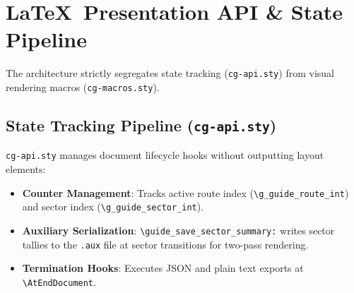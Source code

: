 \clearpage
\section{\LaTeX\ Presentation API \& State Pipeline}

The architecture strictly segregates state tracking (\texttt{cg-api.sty}) from visual rendering macros (\texttt{cg-macros.sty}).

\subsection{State Tracking Pipeline (\texttt{cg-api.sty})}
\texttt{cg-api.sty} manages document lifecycle hooks without outputting layout elements:
\begin{itemize}
    \item \textbf{Counter Management}: Tracks active route index (\texttt{\textbackslash g\_guide\_route\_int}) and sector index (\texttt{\textbackslash g\_guide\_sector\_int}).
    \item \textbf{Auxiliary Serialization}: \texttt{\textbackslash guide\_save\_sector\_summary:} writes sector tallies to the \texttt{.aux} file at sector transitions for two-pass rendering.
    \item \textbf{Termination Hooks}: Executes JSON and plain text exports at \texttt{\textbackslash AtEndDocument}.
\end{itemize}

